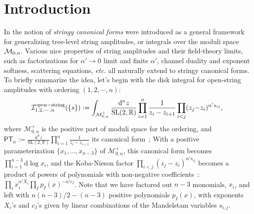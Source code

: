 \documentclass[hidelinks,12pt]{article}
\begin{document}
\vfill \eject



\baselineskip=18pt

\tableofcontents

\newpage
\section{Introduction}

In \cite{} the notion of {\it stringy canonical forms} were introduced as a general framework for generalizing tree-level string amplitudes, or integrals over the moduli space ${\cal M}_{0, n}$. Various nice properties of string amplitudes and their field-theory limits, such as factorizations for $\alpha' \to 0$ limit and finite $\alpha'$, channel duality and exponent softness, scattering equations, {\it etc.} all naturally extend to stringy canonical forms. To briefly summarize the idea, let's begin with the disk integral for open-string amplitudes with ordering $(1,2,\cdots, n)$:
\begin{equation}\label{stringint}
{\cal I}^{\rm open-string}_{1,2,\cdots,n} (\{s\}):=\int_{\mathcal M_{0,n}^+}
\frac{\mathrm d^{n}z}{\mathrm{SL}(2,\mathbb{R})} \prod_{i=1}^{n}\frac{1}{z_{i}-z_{i{+}1}}
\prod_{i<j}(z_j{-}z_i)^{\alpha' s_{ij}},
\end{equation}
where $\mathcal M_{0,n}^+$ is the positive part of moduli space for the ordering, and $\mathsf{PT}_n:=\frac{\mathrm d^{n}z}{\mathrm{SL}(2,\mathbb{R})} \prod_{i=1}^{n}\frac{1}{z_{i}-z_{i+1}}$ its canonical form~\cite{};  %
With a positive parameterization $\{x_1,\dots,x_{n-3}\}$ of $\mathcal M_{0,n}^+$, 
this canonical form becomes $\prod_{i=1}^{n-3}\mathrm d \log x_i$, and the Koba-Nieson factor $\prod_{i<j}(z_j-z_i)^{\alpha' s_{i j}}$ becomes a product of powers of polynomials with 
non-negative coefficients~\cite{}: $\prod_i x_i^{\alpha' X_i} \prod_I p_I(x)^{-\alpha' c_I}$. Note that we have factored out $n{-}3$ monomials, $x_i$, and left with $n(n{-}3)/2-(n{-}3)$ positive polynomials $p_I(x)$, with exponents $X_i$'s and $c_I$'s given by linear combinations of the Mandelstam variables $s_{i,j}$. 
\end{document}

